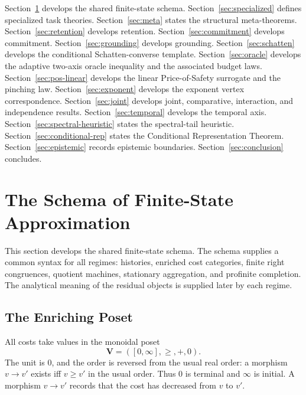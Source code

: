 \documentclass[12pt]{article}
\theoremstyle{definition}
\begin{document}
Section~\ref{sec:schema} develops the shared finite-state schema.
Section~\ref{sec:specialized} defines specialized task theories.
Section~\ref{sec:meta} states the structural meta-theorems.
Section~\ref{sec:retention} develops retention.
Section~\ref{sec:commitment} develops commitment.
Section~\ref{sec:grounding} develops grounding.
Section~\ref{sec:schatten} develops the conditional Schatten-converse
template.
Section~\ref{sec:oracle} develops the adaptive two-axis oracle inequality and
the associated budget laws.
Section~\ref{sec:pos-linear} develops the linear Price-of-Safety surrogate and
the pinching law.
Section~\ref{sec:exponent} develops the exponent vertex correspondence.
Section~\ref{sec:joint} develops joint, comparative, interaction, and
independence results.
Section~\ref{sec:temporal} develops the temporal axis.
Section~\ref{sec:spectral-heuristic} states the spectral-tail heuristic.
Section~\ref{sec:conditional-rep} states the Conditional Representation
Theorem.
Section~\ref{sec:epistemic} records epistemic boundaries.
Section~\ref{sec:conclusion} concludes.

\section{The Schema of Finite-State Approximation}
\label{sec:schema}

This section develops the shared finite-state schema.  The schema supplies a
common syntax for all regimes: histories, enriched cost categories, finite
right congruences, quotient machines, stationary aggregation, and profinite
completion.  The analytical meaning of the residual objects is supplied later
by each regime.

\subsection{The Enriching Poset}
\label{subsec:enriching-poset}

All costs take values in the monoidal poset
\[
\mathbf V=([0,\infty],\ge,+,0).
\]
The unit is $0$, and the order is reversed from the usual real order: a
morphism $v\to v'$ exists iff $v\ge v'$ in the usual order.  Thus $0$ is
terminal and $\infty$ is initial.  A morphism $v\to v'$ records that the cost
has decreased from $v$ to $v'$.
\end{document}
